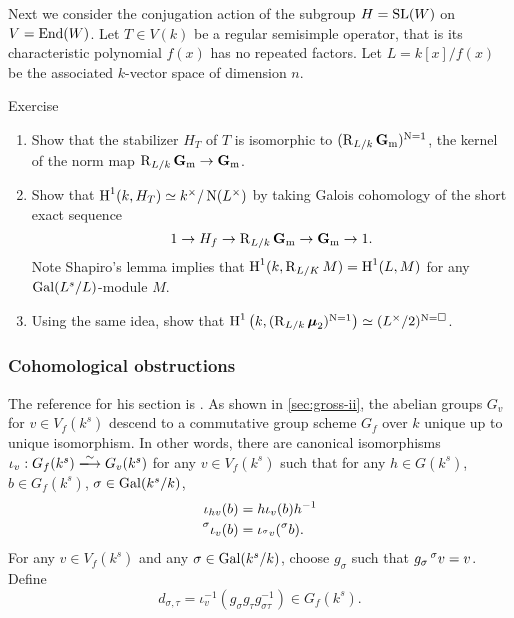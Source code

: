 Next we consider the conjugation action of the subgroup $H=\operatorname{SL}(W)$ 
on $V=\operatorname{End}(W)$. Let $T\in V(k)$ be a regular semisimple operator, that is its 
characteristic polynomial $f(x)$ has no repeated factors. Let $L=k[x]/f(x)$ be 
the associated $k$-vector space of dimension $n$. 

\begin{enonce*}[remark]{Exercise}
\begin{enumerate}
  \item Show that the stabilizer $H_T$ of $T$ is isomorphic to 
    $(\operatorname{R}_{L/k}\mathbf{G}_{\mathrm{m}})^{\operatorname{N}=1}$, the kernel of the norm 
    map $\operatorname{R}_{L/k}\mathbf{G}_{\mathrm{m}}\to\mathbf{G}_{\mathrm{m}}$. 
  \item Show that $\operatorname{H}^1(k,H_T)  \simeq k^\times/\operatorname{N}(L^\times)$ by taking 
    Galois cohomology of the short exact sequence 
    \[
      1 \to H_f \to \operatorname{R}_{L/k}\mathbf{G}_{\mathrm{m}} \to \mathbf{G}_{\mathrm{m}} \to 1 .
    \]
    Note Shapiro's lemma implies that $\operatorname{H}^1(k,\operatorname{R}_{L/K} M) = \operatorname{H}^1(L,M)$ 
    for any $\operatorname{Gal}(L^s/L)$-module $M$. 
  \item Using the same idea, show that 
    $\operatorname{H}^1\left(k,(\operatorname{R}_{L/k}\boldsymbol\mu_2)^{\operatorname{N}=1}\right) \simeq (L^\times/2)^{\operatorname{N}=\square}$. 
\end{enumerate}
\end{enonce*}


\subsubsection{Cohomological obstructions}

The reference for his section is \cite[\S 2]{bgw13}. As shown in 
\autoref{sec:gross-ii}, the abelian groups $G_v$ for $v\in V_f(k^s)$ descend to 
a commutative group scheme $G_f$ over $k$ unique up to unique isomorphism. In 
other words, there are canonical isomorphisms $\iota_v:G_f(k^s)\iso G_v(k^s)$ 
for any $v\in V_f(k^s)$ such that for any $h\in G(k^s)$, $b\in G_f(k^s)$, 
$\sigma\in \operatorname{Gal}(k^s/k)$, 
\begin{align*}
  \iota_{h v}(b) &= h \iota_v(b) h^{-1} \\
  \prescript{\sigma}{}{\iota_v(b)} &= \iota_{\prescript{\sigma}{}{v}}(\prescript{\sigma}{}{b}) .
\end{align*}
For any $v\in V_f(k^s)$ and any $\sigma\in \operatorname{Gal}(k^s/k)$, choose $g_\sigma$ 
such that $g_\sigma \prescript{\sigma}{}{v}=v$. Define 
\[
  d_{\sigma,\tau} = \iota_v^{-1}(g_\sigma g_\tau g_{\sigma\tau}^{-1}) \in G_f(k^s) .
\]

